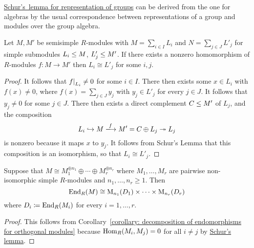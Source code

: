 \begin{remark}
  \hyperref[proposition: Schurs lemma representations]{Schur’s~lemma for representation of groups} can be derived from the one for algebras by the usual correspondence between representations of a group and modules over the group algebra.
\end{remark}


\begin{corollary}
  \label{corollary: no nonzero homomorphisms between disjoint semisimple modules}
  Let $M, M'$ be semisimple $R$-modules with $M = \sum_{i \in I} L_i$ and $N = \sum_{j \in J} L'_j$ for simple submodules $L_i \leq M$, $L'_j \leq M'$.
  If there exists a nonzero homomorphism of $R$-modules $f \colon M \to M'$ then $L_i \cong L'_j$ for some $i, j$.
\end{corollary}


\begin{proof}
  It follows that $\restrict{f}{L_i} \neq 0$ for some $i \in I$.
  There then exists some $x \in L_i$ with $f(x) \neq 0$, where $f(x) = \sum_{j \in J} y_j$ with $y_j \in L'_j$ for every $j \in J$.
  It follows that $y_j \neq 0$ for some $j \in J$.
  There then exists a direct complement $C \leq M'$ of $L_j$, and the composition
  \[
                        L_i
    \inclusion          M
    \xlongrightarrow{f} M'
    =                   C \oplus L_j
    \projection         L_j
  \]
  is nonzero because it maps $x$ to $y_j$.
  It follows from Schur’s Lemma that this composition is an isomorphism, so that $L_i \cong L'_j$.
\end{proof}


\begin{corollary}
  \label{corollary: End is isomorphic to product of matrix rings Schur style}
  Suppose that $M \cong M_1^{\oplus n_1} \oplus \dotsb \oplus M_r^{\oplus n_r}$ where $M_1, \dotsc, M_r$ are pairwise non-isomorphic simple $R$-modules and $n_1, \dotsc, n_r \geq 1$.
  Then
  \[
          \operatorname{End}_R(M)
    \cong \operatorname{M}_{n_1}(D_1) \times \dotsb \times \operatorname{M}_{n_r}(D_r)
  \]
  where $D_i \coloneqq \operatorname{End}_R(M_i)$ for every $i = 1, \dotsc, r$.
\end{corollary}


\begin{proof}
  This follows from Corollary~\ref{corollary: decomposition of endomorphisms for orthogonal modules} because $\operatorname{Hom}_R(M_i, M_j) = 0$ for all $i \neq j$ by \hyperref[proposition: Schurs lemma for modules]{Schur’s lemma}.
\end{proof}



